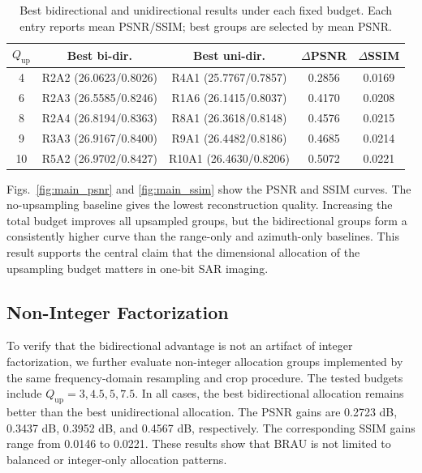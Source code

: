 \documentclass[conference]{IEEEtran}
\begin{document}
\begin{table}[t]
\caption{Best bidirectional and unidirectional results under each fixed budget. Each entry reports mean PSNR/SSIM; best groups are selected by mean PSNR.}
\begin{center}
\scriptsize
\setlength{\tabcolsep}{2pt}
\begin{tabular}{c c c c c}
\hline
$Q_{\mathrm{up}}$ & Best bi-dir. & Best uni-dir. & $\Delta$PSNR & $\Delta$SSIM \\
\hline
4  & R2A2 (26.0623/0.8026) & R4A1 (25.7767/0.7857)  & 0.2856 & 0.0169 \\
6  & R2A3 (26.5585/0.8246) & R1A6 (26.1415/0.8037)  & 0.4170 & 0.0208 \\
8  & R2A4 (26.8194/0.8363) & R8A1 (26.3618/0.8148)  & 0.4576 & 0.0215 \\
9  & R3A3 (26.9167/0.8400) & R9A1 (26.4482/0.8186)  & 0.4685 & 0.0214 \\
10 & R5A2 (26.9702/0.8427) & R10A1 (26.4630/0.8206) & 0.5072 & 0.0221 \\
\hline
\end{tabular}
\label{tab:main_gain}
\end{center}
\end{table}

Figs.~\ref{fig:main_psnr} and \ref{fig:main_ssim} show the PSNR and SSIM curves. The no-upsampling baseline gives the lowest reconstruction quality. Increasing the total budget improves all upsampled groups, but the bidirectional groups form a consistently higher curve than the range-only and azimuth-only baselines. This result supports the central claim that the dimensional allocation of the upsampling budget matters in one-bit SAR imaging.

\subsection{Non-Integer Factorization}

To verify that the bidirectional advantage is not an artifact of integer factorization, we further evaluate non-integer allocation groups implemented by the same frequency-domain resampling and crop procedure. The tested budgets include $Q_{\mathrm{up}}=3,4.5,5,7.5$. In all cases, the best bidirectional allocation remains better than the best unidirectional allocation. The PSNR gains are 0.2723 dB, 0.3437 dB, 0.3952 dB, and 0.4567 dB, respectively. The corresponding SSIM gains range from 0.0146 to 0.0221. These results show that BRAU is not limited to balanced or integer-only allocation patterns.
\end{document}

